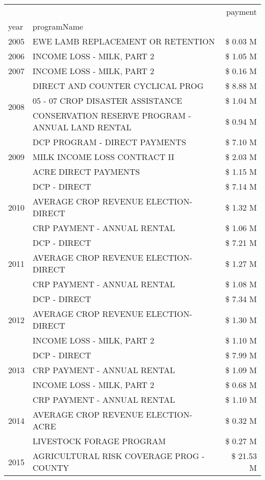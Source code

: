 \begin{tabular}{llr}
\toprule
 &  & payment \\
year & programName &  \\
\midrule
2005 & EWE LAMB REPLACEMENT OR RETENTION & \$ 0.03 M \\
\cline{1-3}
2006 & INCOME LOSS - MILK, PART 2 & \$ 1.05 M \\
\cline{1-3}
2007 & INCOME LOSS - MILK, PART 2 & \$ 0.16 M \\
\cline{1-3}
\multirow[t]{3}{*}{2008} & DIRECT AND COUNTER CYCLICAL PROG & \$ 8.88 M \\
 & 05 - 07 CROP DISASTER ASSISTANCE & \$ 1.04 M \\
 & CONSERVATION RESERVE PROGRAM - ANNUAL LAND RENTAL & \$ 0.94 M \\
\cline{1-3}
\multirow[t]{3}{*}{2009} & DCP PROGRAM - DIRECT PAYMENTS & \$ 7.10 M \\
 & MILK INCOME LOSS CONTRACT II & \$ 2.03 M \\
 & ACRE DIRECT PAYMENTS & \$ 1.15 M \\
\cline{1-3}
\multirow[t]{3}{*}{2010} & DCP - DIRECT & \$ 7.14 M \\
 & AVERAGE CROP REVENUE ELECTION-DIRECT & \$ 1.32 M \\
 & CRP PAYMENT - ANNUAL RENTAL & \$ 1.06 M \\
\cline{1-3}
\multirow[t]{3}{*}{2011} & DCP - DIRECT & \$ 7.21 M \\
 & AVERAGE CROP REVENUE ELECTION-DIRECT & \$ 1.27 M \\
 & CRP PAYMENT - ANNUAL RENTAL & \$ 1.08 M \\
\cline{1-3}
\multirow[t]{3}{*}{2012} & DCP - DIRECT & \$ 7.34 M \\
 & AVERAGE CROP REVENUE ELECTION-DIRECT & \$ 1.30 M \\
 & INCOME LOSS - MILK, PART 2 & \$ 1.10 M \\
\cline{1-3}
\multirow[t]{3}{*}{2013} & DCP - DIRECT & \$ 7.99 M \\
 & CRP PAYMENT - ANNUAL RENTAL & \$ 1.09 M \\
 & INCOME LOSS - MILK, PART 2 & \$ 0.68 M \\
\cline{1-3}
\multirow[t]{3}{*}{2014} & CRP PAYMENT - ANNUAL RENTAL & \$ 1.10 M \\
 & AVERAGE CROP REVENUE ELECTION-ACRE & \$ 0.32 M \\
 & LIVESTOCK FORAGE PROGRAM & \$ 0.27 M \\
\cline{1-3}
\multirow[t]{3}{*}{2015} & AGRICULTURAL RISK COVERAGE PROG - COUNTY & \$ 21.53 M \\

\end{tabular}
